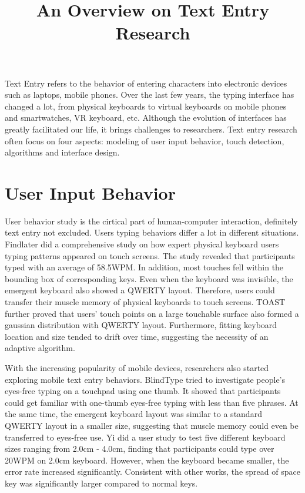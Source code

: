 
\begin{survey}
\label{cha:survey}

\title{An Overview on Text Entry Research}
\maketitle

Text Entry refers to the behavior of entering characters into electronic devices such as laptops, mobile phones. Over the last few years, the typing interface has changed a lot, from physical keyboards to virtual keyboards on mobile phones and smartwatches, VR keyboard, etc. Although the evolution of interfaces has greatly facilitated our life, it brings challenges to researchers. Text entry research often focus on four aspects: modeling of user input behavior, touch detection, algorithms and interface design.

\section{User Input Behavior}
User behavior study is the cirtical part of human-computer interaction, definitely text entry not excluded. Users typing behaviors differ a lot in different situations. Findlater\cite{flatglass2011} did a comprehensive study on how expert physical keyboard users typing patterns appeared on touch screens. The study revealed that participants typed with an average of 58.5WPM. In addition, most touches fell within the bounding box of corresponding keys. Even when the keyboard was invisible, the emergent keyboard also showed a QWERTY layout. Therefore, users could transfer their muscle memory of physical keyboards to touch screens. TOAST \cite{shi2018toast} further proved that users' touch points on a large touchable surface also formed a gaussian distribution with QWERTY layout. Furthermore, fitting keyboard location and size tended to drift over time, suggesting the necessity of an adaptive algorithm.

With the increasing popularity of mobile devices, researchers also started exploring mobile text entry behaviors. BlindType\cite{lu2017blindtype} tried to investigate people's eyes-free typing on a touchpad using one thumb. It showed that participants could get familiar with one-thumb eyes-free typing with less than five phrases. At the same time, the emergent keyboard layout was similar to a standard QWERTY layout in a smaller size, suggesting that muscle memory could even be transferred to eyes-free use. Yi \cite{yi2017too} did a user study to test five different keyboard sizes ranging from 2.0cm - 4.0cm, finding that participants could type over 20WPM on 2.0cm keyboard. However, when the keyboard became smaller, the error rate increased significantly. Consistent with other works, the spread of space key was significantly larger compared to normal keys.


\end{survey}
